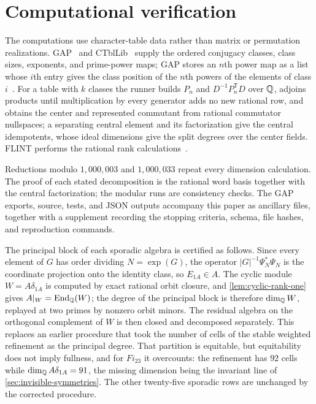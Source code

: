 \section{Computational verification}
\label{sec:certification}

The computations use character-table data rather than matrix or permutation
realizations.  GAP~\cite{GAP} and CTblLib~\cite{CTblLib} supply the ordered
conjugacy classes, class sizes, exponents, and prime-power maps; GAP stores an
\(n\)th power map as a list whose \(i\)th entry gives the class position of
the \(n\)th powers of the elements of class \(i\)~\cite{GAPPowerMaps}.  For a
table with \(k\) classes the runner builds \(P_n\) and
\(D^{-1}P_n^{\mathsf T}D\) over \(\mathbb Q\), adjoins products until multiplication
by every generator adds no new rational row, and obtains the center and
represented commutant from rational commutator nullspaces; a separating
central element and its factorization give the central idempotents, whose
ideal dimensions give the split degrees over the center fields.  FLINT
performs the rational rank calculations~\cite{FLINTRationalMatrices}.

Reductions modulo \(1{,}000{,}003\) and \(1{,}000{,}033\) repeat every
dimension calculation.  The proof of each stated decomposition is the rational
word basis together with the central factorization; the modular runs are
consistency checks.  The GAP exports, source, tests, and JSON outputs accompany this paper as
ancillary files, together with a supplement recording the stopping criteria,
schema, file hashes, and reproduction commands.

The principal block of each sporadic algebra is certified as follows.  Since
every element of \(G\) has order dividing \(N=\exp(G)\), the operator
\(|G|^{-1}\Psi_N^*\Psi_N\) is the coordinate projection onto the identity
class, so \(E_{1A}\in A\).  The cyclic module \(W=A\delta_{1A}\) is computed
by exact rational orbit closure, and \cref{lem:cyclic-rank-one} gives
\(A|_W=\operatorname{End}_\mathbb Q(W)\); the degree of the principal block is therefore
\(\dim_\mathbb Q W\), replayed at two primes by nonzero orbit minors.  The residual
algebra on the orthogonal complement of \(W\) is then closed and decomposed
separately.  This replaces an earlier procedure that took the number of
cells of the stable weighted refinement as the principal degree.  That
partition is equitable, but equitability does not imply fullness, and for
\(Fi_{23}\) it overcounts: the refinement has \(92\) cells while
\(\dim_\mathbb Q A\delta_{1A}=91\), the missing dimension being the invariant
line of \cref{sec:invisible-symmetries}.  The other twenty-five sporadic
rows are unchanged by the corrected procedure.

